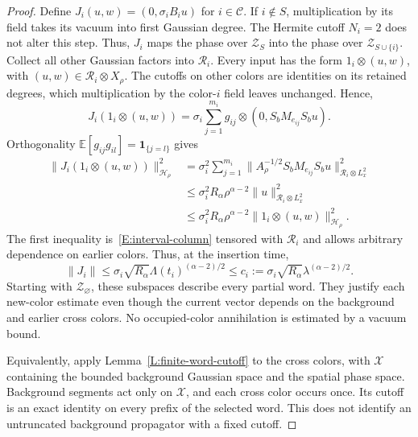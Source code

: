 \documentclass[12pt,oneside,openany]{book}
\numberwithin{equation}{section}
\theoremstyle{nogostyle}
\theoremstyle{definition}
\newcommand{\E}{\mathbb{E}}
\begin{document}
\begin{proof}
  Define $J_i(u,w) = (0,\sigma_i B_i u)$ for $i \in \mathcal{C}$. If $i\notin
  S$, multiplication by its field takes its vacuum into first Gaussian degree.
  The Hermite cutoff $N_i = 2$ does not alter this step. Thus, $J_i$ maps the
  phase over $\mathscr{Z}_S$ into the phase over $\mathscr{Z}_{S\cup\{i\}}$.
  Collect all other Gaussian factors into $\mathscr{R}_i$. Every input has the
  form $1_i\otimes(u,w)$, with $(u,w) \in \mathscr{R}_i\otimes X_\rho$. The
  cutoffs on other colors are identities on its retained degrees, which
  multiplication by the color-$i$ field leaves unchanged. Hence,
  \[
    J_i(1_i\otimes(u,w))
    =\sigma_i\sum_{j=1}^{m_i}g_{ij}\otimes
    (0,S_bM_{e_{ij}}S_bu).
  \]
  Orthogonality $\E[g_{ij}g_{il}] = \mathbf1_{\{j=l\}}$ gives
  \[
    \begin{split}
      \|J_i(1_i\otimes(u,w))\|_{\mathcal{H}_\rho}^2
      &=\sigma_i^2\sum_{j=1}^{m_i}
      \|A_\rho^{-1/2}S_bM_{e_{ij}}S_bu
      \|_{\mathscr{R}_i\otimes L^2_x}^2\\
      &\le\sigma_i^2R_\alpha\rho^{\alpha-2}
      \|u\|_{\mathscr{R}_i\otimes L^2_x}^2\\
      &\le\sigma_i^2R_\alpha\rho^{\alpha-2}
      \|1_i\otimes(u,w)\|_{\mathcal{H}_\rho}^2.
    \end{split}
  \]
  The first inequality is~\eqref{E:interval-column} tensored with
  $\mathscr{R}_i$ and allows arbitrary dependence on earlier colors. Thus, at
  the insertion time,
  \begin{equation}\label{E:split-fresh-insertion}
    \|J_i\|\le\sigma_i\sqrt{R_\alpha}
    \Lambda(t_i)^{(\alpha-2)/2}
    \le c_i:=\sigma_i\sqrt{R_\alpha}\lambda^{(\alpha-2)/2}.
  \end{equation}
  Starting with $\mathscr{Z}_\varnothing$, these subspaces describe every
  partial word. They justify each new-color estimate even though the current
  vector depends on the background and earlier cross colors. No occupied-color
  annihilation is estimated by a vacuum bound.

  Equivalently, apply Lemma~\ref{L:finite-word-cutoff} to the cross colors, with
  $\mathscr{X}$ containing the bounded background Gaussian space and the spatial
  phase space. Background segments act only on $\mathscr{X}$, and each cross
  color occurs once. Its cutoff is an exact identity on every prefix of the
  selected word. This does not identify an untruncated background propagator
  with a fixed cutoff.


\end{proof}
\end{document}
